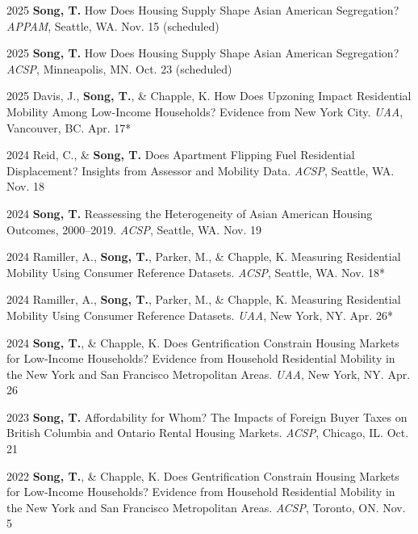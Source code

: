 \documentclass[11pt,letterpaper]{article}
\newcommand{\term}[1]{(#1)}
\begin{document}
\begin{tablist}
  \item[2025] \tab{}\textbf{Song, T.} How Does Housing Supply Shape Asian American Segregation?  
    \emph{APPAM}, Seattle, WA. Nov. 15 \term{scheduled}

  \item[2025] \tab{}\textbf{Song, T.} How Does Housing Supply Shape Asian American Segregation?  
    \emph{ACSP}, Minneapolis, MN. Oct. 23 \term{scheduled}

  \item[2025] \tab{}Davis, J., \textbf{Song, T.}, \& Chapple, K. How Does Upzoning Impact Residential Mobility Among Low-Income Households? Evidence from New York City.  
    \emph{UAA}, Vancouver, BC. Apr. 17*

  \item[2024] \tab{}Reid, C., \& \textbf{Song, T.} Does Apartment Flipping Fuel Residential Displacement? Insights from Assessor and Mobility Data.  
    \emph{ACSP}, Seattle, WA. Nov. 18

  \item[2024] \tab{}\textbf{Song, T.} Reassessing the Heterogeneity of Asian American Housing Outcomes, 2000–2019.  
    \emph{ACSP}, Seattle, WA. Nov. 19

  \item[2024] \tab{}Ramiller, A., \textbf{Song, T.}, Parker, M., \& Chapple, K. Measuring Residential Mobility Using Consumer Reference Datasets.  
    \emph{ACSP}, Seattle, WA. Nov. 18*

  \item[2024] \tab{}Ramiller, A., \textbf{Song, T.}, Parker, M., \& Chapple, K. Measuring Residential Mobility Using Consumer Reference Datasets.  
    \emph{UAA}, New York, NY. Apr. 26*

  \item[2024] \tab{}\textbf{Song, T.}, \& Chapple, K. Does Gentrification Constrain Housing Markets for Low-Income Households? Evidence from Household Residential Mobility in the New York and San Francisco Metropolitan Areas.  
    \emph{UAA}, New York, NY. Apr. 26

  \item[2023] \tab{}\textbf{Song, T.} Affordability for Whom? The Impacts of Foreign Buyer Taxes on British Columbia and Ontario Rental Housing Markets.  
    \emph{ACSP}, Chicago, IL. Oct. 21

  \item[2022] \tab{}\textbf{Song, T.}, \& Chapple, K. Does Gentrification Constrain Housing Markets for Low-Income Households? Evidence from Household Residential Mobility in the New York and San Francisco Metropolitan Areas.  
    \emph{ACSP}, Toronto, ON. Nov. 5
\end{tablist}
\end{document}
